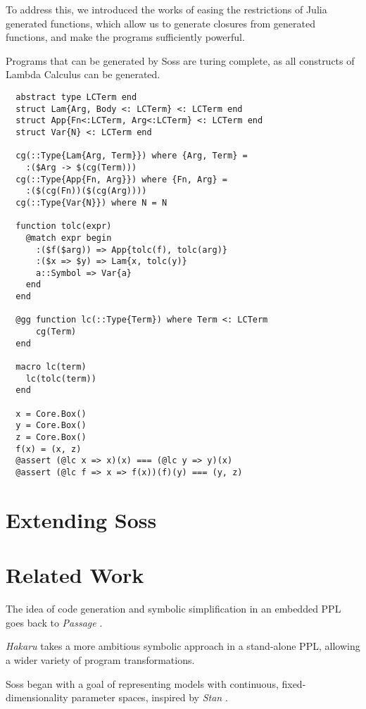 \documentclass[anonymous=false, %
               format=acmsmall, %
               review=true, %
               screen=true, %
               nonacm=true]{acmart}
\begin{document}
To address this, we introduced the works of easing the restrictions of Julia generated functions,
which allow us to generate closures from generated functions, and make the programs sufficiently powerful.

Programs that can be generated by Soss are turing complete, as all constructs of Lambda Calculus can be generated.

\begin{verbatim}
  abstract type LCTerm end
  struct Lam{Arg, Body <: LCTerm} <: LCTerm end
  struct App{Fn<:LCTerm, Arg<:LCTerm} <: LCTerm end
  struct Var{N} <: LCTerm end
  
  cg(::Type{Lam{Arg, Term}}) where {Arg, Term} = 
    :($Arg -> $(cg(Term)))
  cg(::Type{App{Fn, Arg}}) where {Fn, Arg} = 
    :($(cg(Fn))($(cg(Arg))))
  cg(::Type{Var{N}}) where N = N

  function tolc(expr)
    @match expr begin
      :($f($arg)) => App{tolc(f), tolc(arg)}
      :($x => $y) => Lam{x, tolc(y)}
      a::Symbol => Var{a}
    end
  end
  
  @gg function lc(::Type{Term}) where Term <: LCTerm
      cg(Term)
  end
  
  macro lc(term)
    lc(tolc(term))
  end
  
  x = Core.Box()
  y = Core.Box()
  z = Core.Box()
  f(x) = (x, z)
  @assert (@lc x => x)(x) === (@lc y => y)(x)
  @assert (@lc f => x => f(x))(f)(y) === (y, z)
  \end{verbatim} 



\section{Extending Soss}

\section{Related Work}

The idea of code generation and symbolic simplification in an embedded PPL goes back to \emph{Passage} \cite{Scherrer2012}. 

\emph{Hakaru} \cite{narayanan2016probabilistic} takes a more ambitious symbolic approach in a stand-alone PPL, allowing a wider variety of program transformations. 

Soss began with a goal of representing models with continuous, fixed-dimensionality parameter spaces, inspired by \emph{Stan} \cite{stan:2017}.
\end{document}
